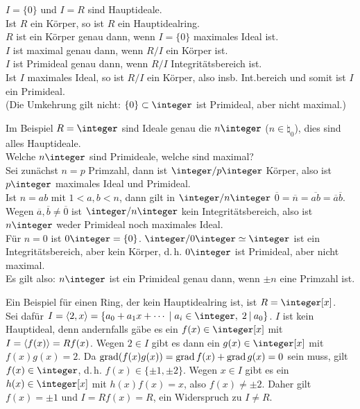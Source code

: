 \begin{Bem}
    $I = \{0\}$ und $I = R$ sind Hauptideale.\\
    Ist $R$ ein Körper, so ist $R$ ein Hauptidealring.\\
    $R$ ist ein Körper genau dann, wenn $I = \{0\}$ maximales Ideal ist.\\
    $I$ ist maximal genau dann, wenn $R/I$ ein Körper ist.\\
    $I$ ist Primideal genau dann, wenn $R/I$ Integritätsbereich ist.\\
    Ist $I$ maximales Ideal, so ist $R/I$ ein Körper, also insb.
    Int.bereich und somit ist $I$ ein Primideal.\\
    (Die Umkehrung gilt nicht: $\{0\} \subset \integer$ ist Primideal,
    aber nicht maximal.)
\end{Bem}

\linie

\begin{Bsp}
    Im Beispiel $R = \integer$ sind Ideale genau die $n\integer$
    ($n \in \natural_0$), dies sind alles Hauptideale.\\
    Welche $n\integer$ sind Primideale, welche sind maximal?\\
    Sei zunächst $n = p$ Primzahl, dann ist $\integer/p\integer$ Körper,
    also ist $p\integer$ maximales Ideal und Primideal.\\
    Ist $n = ab$ mit $1 < a, b < n$, dann gilt in $\integer/n\integer$
    $\overline{0} = \overline{n} = \overline{ab} = \overline{a} \overline{b}$.
    Wegen $\overline{a}, \overline{b} \not= \overline{0}$ ist
    $\integer/n\integer$ kein Integritätsbereich, also ist $n\integer$
    weder Primideal noch maximales Ideal.\\
    Für $n = 0$ ist $0\integer = \{0\}$.
    $\integer/0\integer \simeq \integer$ ist ein Integritätsbereich, aber kein
    Körper,
    d.\,h. $0\integer$ ist Primideal, aber nicht maximal.\\
    Es gilt also: $n\integer$ ist ein Primideal genau dann, wenn $\pm n$
    eine Primzahl ist.
\end{Bsp}

\begin{Bem}
    Ein Beispiel für einen Ring, der kein Hauptidealring ist, ist
    $R = \integer[x]$.\\
    Sei dafür $I = \erzeugnis{2, x} =
    \{a_0 + a_1 x + \dotsb \;|\; a_i \in \integer,\; 2 \teilt a_0\}$.
    $I$ ist kein Hauptideal, denn andernfalls
    gäbe es ein $f(x) \in \integer[x]$ mit $I = \left\langle f(x)\right\rangle = Rf(x)$.
    Wegen $2 \in I$ gibt es dann ein $g(x) \in \integer[x]$ mit
    $f(x) g(x) = 2$.
    Da $\operatorname{grad}(f(x)g(x)) = \operatorname{grad} f(x) + \operatorname{grad} g(x) = 0$ sein muss,
    gilt $f(x) \in \integer$, d.\,h. $f(x) \in \{\pm 1, \pm 2\}$.
    Wegen $x \in I$ gibt es ein $h(x) \in \integer[x]$ mit $h(x) f(x) = x$,
    also $f(x) \not= \pm 2$.
    Daher gilt $f(x) = \pm 1$ und $I = Rf(x) = R$, ein Widerspruch zu
    $I \not= R$.
\end{Bem}

